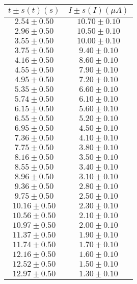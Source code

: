 \documentclass[12pt, letterpaper]{article} %
\theoremstyle{plain} %
\begin{document}
\begin{figure}[H]
\centering
\begin{minipage}[t]{0.48\textwidth}
\centering
\footnotesize
\begin{minipage}[t]{\linewidth}
\centering
\setlength{\arrayrulewidth}{1.2pt}
\begin{tabular}{|c|c|}
\hline
$t \pm s(t) (s)$ & $I \pm s(I) (\mu A)$ \\
\hline
$2.54 \pm 0.50$ & $10.70 \pm 0.10$ \\
$2.96 \pm 0.50$ & $10.50 \pm 0.10$ \\
$3.55 \pm 0.50$ & $10.00 \pm 0.10$ \\
$3.75 \pm 0.50$ & $9.40 \pm 0.10$ \\
$4.16 \pm 0.50$ & $8.60 \pm 0.10$ \\
$4.55 \pm 0.50$ & $7.90 \pm 0.10$ \\
$4.95 \pm 0.50$ & $7.20 \pm 0.10$ \\
$5.35 \pm 0.50$ & $6.60 \pm 0.10$ \\
$5.74 \pm 0.50$ & $6.10 \pm 0.10$ \\
$6.15 \pm 0.50$ & $5.60 \pm 0.10$ \\
$6.55 \pm 0.50$ & $5.20 \pm 0.10$ \\
$6.95 \pm 0.50$ & $4.50 \pm 0.10$ \\
$7.36 \pm 0.50$ & $4.10 \pm 0.10$ \\
$7.75 \pm 0.50$ & $3.80 \pm 0.10$ \\
$8.16 \pm 0.50$ & $3.50 \pm 0.10$ \\
$8.55 \pm 0.50$ & $3.40 \pm 0.10$ \\
$8.96 \pm 0.50$ & $3.10 \pm 0.10$ \\
$9.36 \pm 0.50$ & $2.80 \pm 0.10$ \\
$9.75 \pm 0.50$ & $2.50 \pm 0.10$ \\
$10.16 \pm 0.50$ & $2.30 \pm 0.10$ \\
$10.56 \pm 0.50$ & $2.10 \pm 0.10$ \\
$10.97 \pm 0.50$ & $2.00 \pm 0.10$ \\
$11.37 \pm 0.50$ & $1.90 \pm 0.10$ \\
$11.74 \pm 0.50$ & $1.70 \pm 0.10$ \\
$12.16 \pm 0.50$ & $1.60 \pm 0.10$ \\
$12.52 \pm 0.50$ & $1.50 \pm 0.10$ \\
$12.97 \pm 0.50$ & $1.30 \pm 0.10$ \\

\end{tabular}
\end{minipage}
\end{minipage}
\end{figure}
\end{document}
